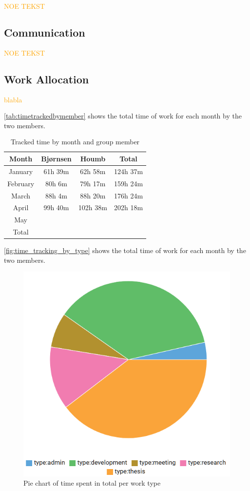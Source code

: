 \textcolor{orange}{NOE TEKST}

\subsection{Communication}

\textcolor{orange}{NOE TEKST}

\subsection{Work Allocation}

\textcolor{orange}{blabla}

\autoref{tab:timetrackedbymember} shows the total time of work for each month by the two members.

\begin{table}[h]
    \centering
    \begin{tabular}{c|c|c|c}
        \hline
        \textbf{Month} & \textbf{Bjørnsen} & \textbf{Houmb} & \textbf{Total} \\
        \hline
        January  & 61h 39m  & 62h 58m  & 124h 37m \\
        February & 80h 6m   & 79h 17m  & 159h 24m \\
        March    & 88h 4m   & 88h 20m  & 176h 24m \\
        April    & 99h 40m  & 102h 38m  & 202h 18m \\
        May      &        &        &        \\
        \hline
        Total & & & \\
        \hline
    \end{tabular}
    \caption{Tracked time by month and group member}
    \label{tab:timetrackedbymember}
\end{table}


\autoref{fig:time_tracking_by_type} shows the total time of work for each month by the two members.

\begin{figure}[h]
    \centering
    \includegraphics[width=0.5\linewidth]{figures/traggo_pie_chart_by_type.png}
    \caption{Pie chart of time spent in total per work type}
    \label{fig:time_tracking_by_type}
\end{figure}

